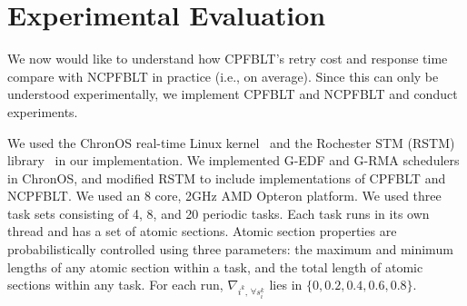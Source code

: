 \documentclass[conference]{IEEEtran}
\begin{document}
\section{Experimental Evaluation}\label{exp_eval}
%
We now would like to understand how CPFBLT's retry cost and response time compare with NCPFBLT in practice (i.e., on average). Since this can only be understood experimentally, we implement CPFBLT and NCPFBLT and conduct experiments. 

We used the ChronOS real-time Linux kernel~\cite{dellinger2011chronos} and the Rochester STM (RSTM) library~\cite{marathe2006lowering} in our implementation. We implemented G-EDF and G-RMA schedulers in ChronOS, and modified RSTM to include implementations of CPFBLT and NCPFBLT. We used an 8 core, 2GHz AMD Opteron platform. We used three task sets consisting of 4, 8, and 20 periodic tasks. Each task runs in its own thread and has a set of atomic sections. Atomic section properties are probabilistically controlled using three parameters: the maximum and minimum lengths of any atomic section within a task, and the total length of atomic sections within any task. For each run, $\nabla_{i^k,\,\forall s_i^k}$ lies in $\{0,0.2,0.4,0.6,0.8\}$.
\end{document}
